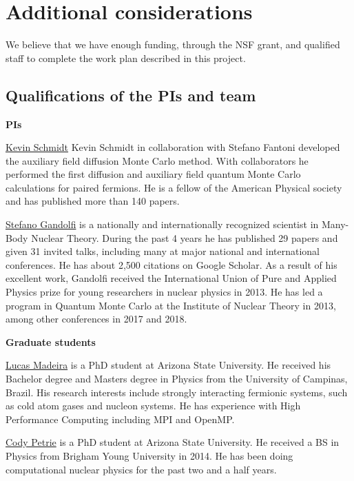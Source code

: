\documentclass[12pt,letterpaper]{article}
\begin{document}
\section{Additional considerations}

We believe that we have enough funding, through the NSF grant, and qualified 
staff to complete the work plan described in this project.

\subsection{Qualifications of the PIs and team}

\textbf{PIs}

\underline{Kevin Schmidt}
Kevin Schmidt in collaboration with Stefano Fantoni developed the
auxiliary field diffusion Monte Carlo method. With collaborators
he performed the first diffusion and auxiliary field quantum
Monte Carlo calculations for paired fermions.  He is a fellow of
the American Physical society and has published more than 140 papers.

\underline{Stefano Gandolfi} is a nationally and 
internationally recognized scientist in Many-Body Nuclear Theory. During the 
past 4 years he has published 29 papers and given 31 invited talks, 
including many at major national and international conferences. He has about 
2,500 citations on Google Scholar. As a result of his excellent work, 
Gandolfi received the International Union of Pure and Applied Physics prize 
for young researchers in nuclear physics in 2013. He has led a program in 
Quantum Monte Carlo at the Institute of Nuclear Theory in 2013, among other
conferences in 2017 and 2018.

\textbf{Graduate students}

\underline{Lucas Madeira} is a PhD student at Arizona State University. He 
received his Bachelor degree and Masters degree in Physics from the 
University of Campinas, Brazil.
His research interests include strongly interacting fermionic systems, such as 
cold atom gases and nucleon systems.
He has experience with High Performance 
Computing including MPI and OpenMP.

\underline{Cody Petrie} is a PhD student at Arizona State University. He 
received a BS in Physics from Brigham Young University in 2014. He has been 
doing computational nuclear physics for the past two and a half years.



\end{document}
